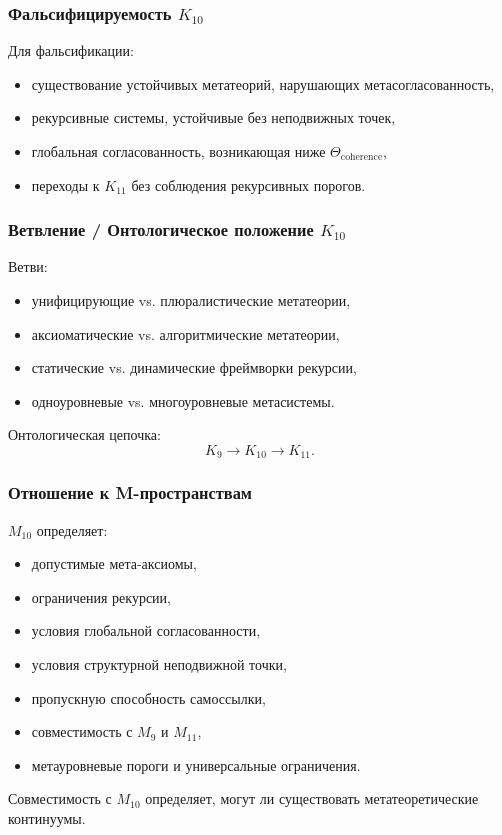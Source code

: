 \subsubsection{Фальсифицируемость $K_{10}$}

Для фальсификации:
\begin{itemize}
    \item существование устойчивых метатеорий, нарушающих метасогласованность,
    \item рекурсивные системы, устойчивые без неподвижных точек,
    \item глобальная согласованность, возникающая ниже $\Theta_{\mathrm{coherence}}$,
    \item переходы к $K_{11}$ без соблюдения рекурсивных порогов.
\end{itemize}

\subsubsection{Ветвление / Онтологическое положение $K_{10}$}

Ветви:
\begin{itemize}
    \item унифицирующие vs. плюралистические метатеории,
    \item аксиоматические vs. алгоритмические метатеории,
    \item статические vs. динамические фреймворки рекурсии,
    \item одноуровневые vs. многоуровневые метасистемы.
\end{itemize}

Онтологическая цепочка:
\[
K_9 \to K_{10} \to K_{11}.
\]

\subsubsection{Отношение к M-пространствам}

$M_{10}$ определяет:
\begin{itemize}
    \item допустимые мета-аксиомы,
    \item ограничения рекурсии,
    \item условия глобальной согласованности,
    \item условия структурной неподвижной точки,
    \item пропускную способность самоссылки,
    \item совместимость с $M_9$ и $M_{11}$,
    \item метауровневые пороги и универсальные ограничения.
\end{itemize}

Совместимость с $M_{10}$ определяет, могут ли существовать метатеоретические континуумы.
